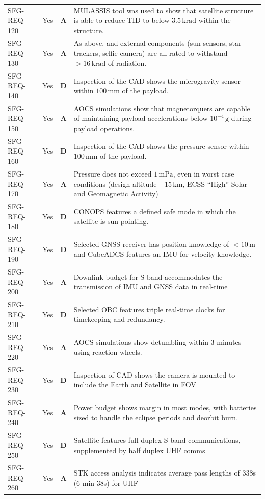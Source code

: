 \documentclass[a4paper, 11pt, conference]{IEEEtran}
\begin{document}
\begin{table}[H]
\begin{tabularx}{\textwidth}{l c c X}
SFG-REQ-120 & Yes & \textbf{A} & MULASSIS tool was used to show that satellite structure is able to reduce TID to below $3.5\,\mathrm{krad}$ within the structure. \\
SFG-REQ-130 & Yes & \textbf{A} & As above, and external components (sun sensors, star trackers, selfie camera) are all rated to withstand $>16\,\mathrm{krad}$ of radiation. \\
SFG-REQ-140 & Yes & \textbf{D} & Inspection of the CAD shows the microgravity sensor within $100\,\mathrm{mm}$ of the payload. \\
SFG-REQ-150 & Yes & \textbf{A} & AOCS simulations show that magnetorquers are capable of maintaining payload accelerations below $10^{-4}\,\mathrm{g}$ during payload operations. \\
SFG-REQ-160 & Yes & \textbf{D} & Inspection of the CAD shows the pressure sensor within $100\,\mathrm{mm}$ of the payload. \\
SFG-REQ-170 & Yes & \textbf{A} & Pressure does not exceed $1\,\mathrm{mPa}$, even in worst case conditions (design altitude $-15\,\mathrm{km}$, ECSS “High” Solar and Geomagnetic Activity)\\
SFG-REQ-180 & Yes & \textbf{D} & CONOPS features a defined safe mode in which the satellite is sun-pointing. \\
SFG-REQ-190 & Yes & \textbf{D} & Selected GNSS receiver has position knowledge of $<10\,\mathrm{m}$ and CubeADCS features an IMU for velocity knowledge. \\
SFG-REQ-200 & Yes & \textbf{A} & Downlink budget for S-band accommodates the transmission of IMU and GNSS data in real-time \\
SFG-REQ-210 & Yes & \textbf{D} & Selected OBC features triple real-time clocks for timekeeping and redundancy.\\
SFG-REQ-220 & Yes & \textbf{A} & AOCS simulations show detumbling within 3 minutes using reaction wheels.\\
SFG-REQ-230 & Yes & \textbf{D} & Inspection of CAD shows the camera is mounted to include the Earth and Satellite in FOV \\
SFG-REQ-240 & Yes & \textbf{A} & Power budget shows margin in most modes, with batteries sized to handle the eclipse periods and deorbit burn. \\
SFG-REQ-250 & Yes & \textbf{D} & Satellite features full duplex S-band communications, supplemented by half duplex UHF comms \\
SFG-REQ-260 & Yes & \textbf{A} & STK access analysis indicates average pass lengths of 338s (6 min 38s) for UHF \\

\end{tabularx}
\end{table}
\end{document}
